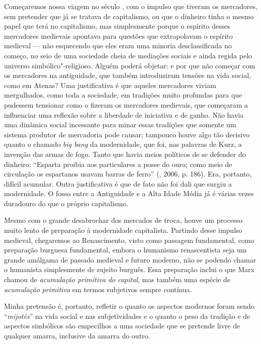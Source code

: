 Começaremos nossa viagem no século , com o impulso que tiveram os mercadores, sem
pretender que já se tratava de capitalismo, ou que o dinheiro tinha o
mesmo papel que terá no capitalismo, mas simplesmente porque o espírito
desses mercadores medievais apontava para questões que extrapolavam o
espírito medieval --- não esquecendo que eles eram uma minoria
desclassificada no começo, no seio de uma sociedade cheia de mediações
sociais e ainda regida pelo universo simbólico"-religioso. Alguém poderá
objetar: e por que não começar com os mercadores na antiguidade, que
também introduziram tensões na vida social, como em Atenas? Uma
justificativa é que aqueles mercadores viviam mergulhados, como toda a
sociedade, em tradições muito profundas para que pudessem tensionar como
o fizeram os mercadores medievais, que começaram a influenciar uma
reflexão sobre a liberdade de iniciativa e de ganho. Não havia uma
dinâmica social incessante para minar essas tradições que somente um
sistema produtor de mercadoria pode causar; tampouco houve algo tão
decisivo quanto o chamado \emph{big bang} da modernidade, que foi, nas
palavras de Kurz, a invenção das armas de fogo. Tanto que havia
meios políticos de se defender do dinheiro: ``Esparta proibia aos
particulares a posse do ouro; como meio de circulação os espartanos
usavam barras de ferro'' (, 2006, p. 186). Era, portanto, difícil
acumular. Outra justificativa é que de fato não foi dali que surgiu a
modernidade. O fosso entre a Antiguidade e a Alta Idade Média já é
várias vezes duradouro do que o próprio capitalismo.

Mesmo com o grande desabrochar dos mercados de troca, houve um processo
muito lento de preparação à modernidade capitalista. Partindo desse
impulso medieval, chegaremos ao Renascimento, visto como passagem
fundamental, como preparação burguesa fundamental, embora o humanismo
renascentista seja um grande amálgama de passado medieval e futuro
moderno, não se podendo chamar o humanista simplesmente de sujeito
burguês. Essa preparação inclui o que Marx chamou de \emph{acumulação
primitiva do capital}, mas também uma espécie de
\emph{acumulação} \emph{primitiva} em termos subjetivos sempre contínua.

Minha pretensão é, portanto, refletir o quanto os aspectos modernos foram
sendo ``\emph{mijotés}'' na vida social e nas subjetividades e o quanto
o peso da tradição e de aspectos simbólicos são empecilhos a uma
sociedade que se pretende livre de qualquer amarra, inclusive da amarra
do outro.

